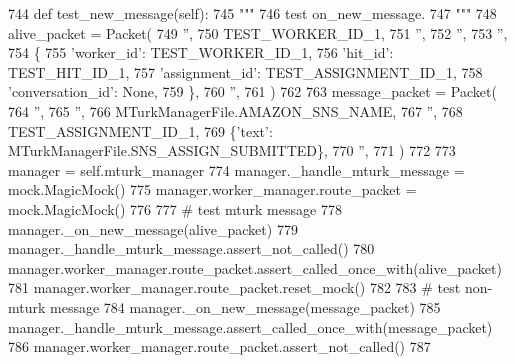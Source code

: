 \begin{DoxyCode}
744     \textcolor{keyword}{def }test\_new\_message(self):
745         \textcolor{stringliteral}{"""}
746 \textcolor{stringliteral}{        test on\_new\_message.}
747 \textcolor{stringliteral}{        """}
748         alive\_packet = Packet(
749             \textcolor{stringliteral}{''},
750             TEST\_WORKER\_ID\_1,
751             \textcolor{stringliteral}{''},
752             \textcolor{stringliteral}{''},
753             \textcolor{stringliteral}{''},
754             \{
755                 \textcolor{stringliteral}{'worker\_id'}: TEST\_WORKER\_ID\_1,
756                 \textcolor{stringliteral}{'hit\_id'}: TEST\_HIT\_ID\_1,
757                 \textcolor{stringliteral}{'assignment\_id'}: TEST\_ASSIGNMENT\_ID\_1,
758                 \textcolor{stringliteral}{'conversation\_id'}: \textcolor{keywordtype}{None},
759             \},
760             \textcolor{stringliteral}{''},
761         )
762 
763         message\_packet = Packet(
764             \textcolor{stringliteral}{''},
765             \textcolor{stringliteral}{''},
766             MTurkManagerFile.AMAZON\_SNS\_NAME,
767             \textcolor{stringliteral}{''},
768             TEST\_ASSIGNMENT\_ID\_1,
769             \{\textcolor{stringliteral}{'text'}: MTurkManagerFile.SNS\_ASSIGN\_SUBMITTED\},
770             \textcolor{stringliteral}{''},
771         )
772 
773         manager = self.mturk\_manager
774         manager.\_handle\_mturk\_message = mock.MagicMock()
775         manager.worker\_manager.route\_packet = mock.MagicMock()
776 
777         \textcolor{comment}{# test mturk message}
778         manager.\_on\_new\_message(alive\_packet)
779         manager.\_handle\_mturk\_message.assert\_not\_called()
780         manager.worker\_manager.route\_packet.assert\_called\_once\_with(alive\_packet)
781         manager.worker\_manager.route\_packet.reset\_mock()
782 
783         \textcolor{comment}{# test non-mturk message}
784         manager.\_on\_new\_message(message\_packet)
785         manager.\_handle\_mturk\_message.assert\_called\_once\_with(message\_packet)
786         manager.worker\_manager.route\_packet.assert\_not\_called()
787 
\end{DoxyCode}
\mbox{\label{classparlai_1_1mturk_1_1core_1_1legacy__2018_1_1test_1_1test__mturk__manager_1_1TestMTurkManagerUnitFunctions_a1458ad19b550e2c63cbc89cc11fcb94b}} 
